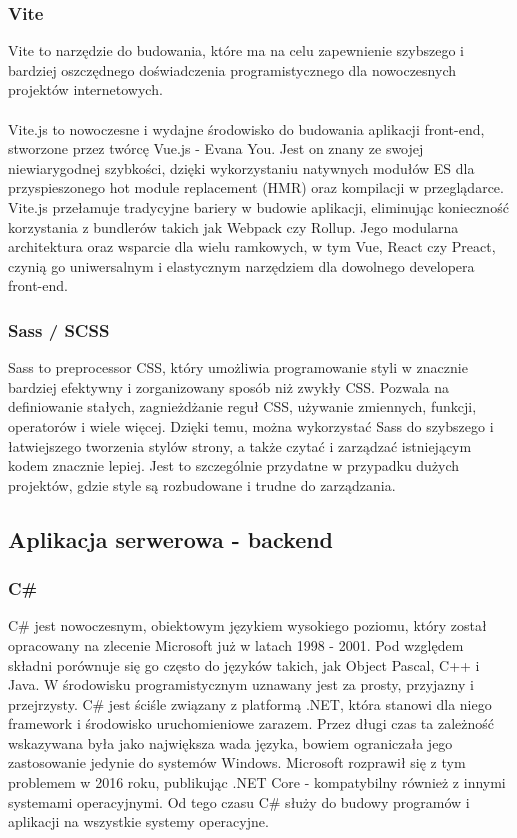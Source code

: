 \documentclass[12pt,a4paper]{article}
\begin{document}
\subsubsection{Vite}
Vite to narzędzie do budowania, które ma na celu zapewnienie szybszego i bardziej oszczędnego doświadczenia programistycznego dla nowoczesnych projektów internetowych.
\\\\
Vite.js to nowoczesne i wydajne środowisko do budowania aplikacji front-end, stworzone przez twórcę Vue.js - Evana You. Jest on znany ze swojej niewiarygodnej szybkości, dzięki wykorzystaniu natywnych modułów ES dla przyspieszonego hot module replacement (HMR) oraz kompilacji w przeglądarce. Vite.js przełamuje tradycyjne bariery w budowie aplikacji, eliminując konieczność korzystania z bundlerów takich jak Webpack czy Rollup. Jego modularna architektura oraz wsparcie dla wielu ramkowych, w tym Vue, React czy Preact, czynią go uniwersalnym i elastycznym narzędziem dla dowolnego developera front-end.

\subsubsection{Sass / SCSS}
Sass to preprocessor CSS, który umożliwia programowanie styli w znacznie bardziej efektywny i zorganizowany sposób niż zwykły CSS. Pozwala na definiowanie stałych, zagnieżdżanie reguł CSS, używanie zmiennych, funkcji, operatorów i wiele więcej. Dzięki temu, można wykorzystać Sass do szybszego i łatwiejszego tworzenia stylów strony, a także czytać i zarządzać istniejącym kodem znacznie lepiej. Jest to szczególnie przydatne w przypadku dużych projektów, gdzie style są rozbudowane i trudne do zarządzania.

\subsection{Aplikacja serwerowa - backend}
\subsubsection{C\#}
C\# jest nowoczesnym, obiektowym językiem wysokiego poziomu, który został opracowany na zlecenie Microsoft już w latach 1998 - 2001. Pod względem składni porównuje się go często do języków takich, jak Object Pascal, C++ i Java. W środowisku programistycznym uznawany jest za prosty, przyjazny i przejrzysty. C\# jest ściśle związany z platformą .NET, która stanowi dla niego framework i środowisko uruchomieniowe zarazem. Przez długi czas ta zależność wskazywana była jako największa wada języka, bowiem ograniczała jego zastosowanie jedynie do systemów Windows. Microsoft rozprawił się z tym problemem w 2016 roku, publikując .NET Core - kompatybilny również z innymi systemami operacyjnymi. Od tego czasu C\# służy do budowy programów i aplikacji na wszystkie systemy operacyjne.
\end{document}

